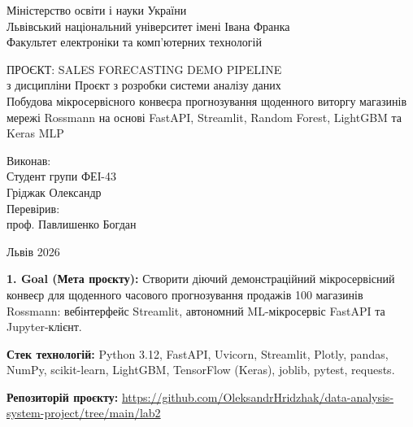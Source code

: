 \documentclass[14pt,a4paper]{extarticle}
\begin{document}
\begin{center}
Міністерство освіти і науки України\\
Львівський національний університет імені Івана Франка\\
Факультет електроніки та комп'ютерних технологій
\end{center}

\vspace{4.5cm}

\begin{center}
ПРОЄКТ: SALES FORECASTING DEMO PIPELINE\\
з дисципліни \textquotedbl Проєкт з розробки системи аналізу даних\textquotedbl\\
\textquotedbl Побудова мікросервісного конвеєра прогнозування щоденного виторгу магазинів мережі Rossmann на основі FastAPI, Streamlit, Random Forest, LightGBM та Keras MLP\textquotedbl
\end{center}

\vspace{3.0cm}

\begin{flushright}
Виконав:\\
Студент групи ФЕІ-43\\
Гріджак Олександр\\
Перевірив:\\
проф. Павлишенко Богдан
\end{flushright}

\vfill

\begin{center}
Львів 2026
\end{center}
\clearpage

\noindent\hspace{1.25cm}\textbf{1. Goal (Мета проєкту):} Створити діючий демонстраційний мікросервісний конвеєр для щоденного часового прогнозування продажів 100 магазинів Rossmann: вебінтерфейс Streamlit, автономний ML-мікросервіс FastAPI та Jupyter-клієнт.

\noindent\hspace{1.25cm}\textbf{Стек технологій:} Python 3.12, FastAPI, Uvicorn, Streamlit, Plotly, pandas, NumPy, scikit-learn, LightGBM, TensorFlow (Keras), joblib, pytest, requests.

\noindent\hspace{1.25cm}\textbf{Репозиторій проєкту:} \url{https://github.com/OleksandrHridzhak/data-analysis-system-project/tree/main/lab2}
\end{document}
